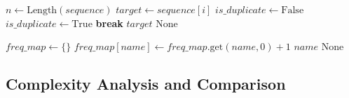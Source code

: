 \begin{algorithm}[H]
\caption{Approach 1: List-Only Repeated Comparisons ($O(1)$ Auxiliary Space)}
\begin{algorithmic}[1]
    \State $n \gets \text{Length}(sequence)$
        \State $target \gets sequence[i]$
        \State $is\_duplicate \gets \text{False}$
                \State $is\_duplicate \gets \text{True}$
                \State \textbf{break} 
            \EndIf
        \EndFor
            \State \Return $target$ 
        \EndIf
    \EndFor
    \State \Return $\text{None}$
\EndFunction
\end{algorithmic}
\end{algorithm}

\begin{algorithm}[H]
\caption{Approach 2: Hash Map / Frequency Map ($O(n \cdot K)$ Time)}
\begin{algorithmic}[1]
    \State $freq\_map \gets \{\}$
     
        \State $freq\_map[name] \gets freq\_map.\text{get}(name, 0) + 1$
    \EndFor
     
            \State \Return $name$ 
        \EndIf
    \EndFor
    \State \Return $\text{None}$
\EndFunction
\end{algorithmic}
\end{algorithm}

\subsection{Complexity Analysis and Comparison}

